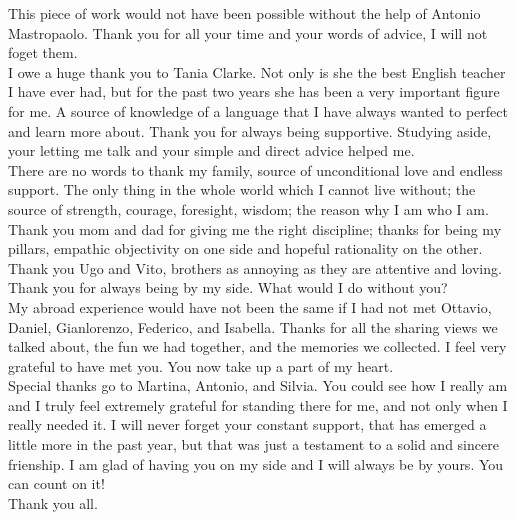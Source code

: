 \begin{acknowledgements}
This piece of work would not have been possible without the help of Antonio Mastropaolo. 
Thank you for all your time and your words of advice, I will not foget them.\\
\newline
I owe a huge thank you to Tania Clarke. Not only is she the best English teacher I have ever had, 
but for the past two years she has been a very important figure for me. A source of knowledge
of a language that I have always wanted to perfect and learn more about. Thank you for always being supportive.
Studying aside, your letting me talk and your simple and direct advice helped me.\\
\newline
There are no words to thank my family, source of unconditional love and endless support. 
The only thing in the whole world which I cannot live without;
the source of strength, courage, foresight, wisdom; the reason why I am who I am.
Thank you mom and dad for giving me the right discipline; thanks for being my pillars, 
empathic objectivity on one side and hopeful rationality on the other. Thank you Ugo and Vito, 
brothers as annoying as they are attentive and loving. Thank you for always being by my side. What would I do without you?\\
\newline
My abroad experience would have not been the same if I had not met Ottavio, Daniel, Gianlorenzo, Federico, and Isabella. 
Thanks for all the sharing views we talked about, the fun we had together, and the memories we collected. I feel very grateful to have met you.
You now take up a part of my heart.\\
\newline
Special thanks go to Martina, Antonio, and Silvia. 
You could see how I really am and I truly feel extremely grateful 
for standing there for me, and not only when I really needed it. 
I will never forget your constant support, that has emerged a little more in the past year, but that was 
just a testament to a solid and sincere frienship. I am glad of having you on my side and I will always be by yours.
You can count on it!\\
\newline
Thank you all.
\end{acknowledgements}
